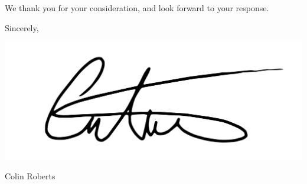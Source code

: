 \documentclass[12pt]{amsart}
\begin{document}
We thank you for your consideration, and look forward to your response.



\bigskip\bigskip

\qquad\qquad Sincerely,

\qquad\qquad\qquad\qquad \includegraphics[scale=0.2]{sig.png}

\vspace{-.1in}

\qquad\qquad\qquad\qquad\qquad Colin Roberts



\end{document}
